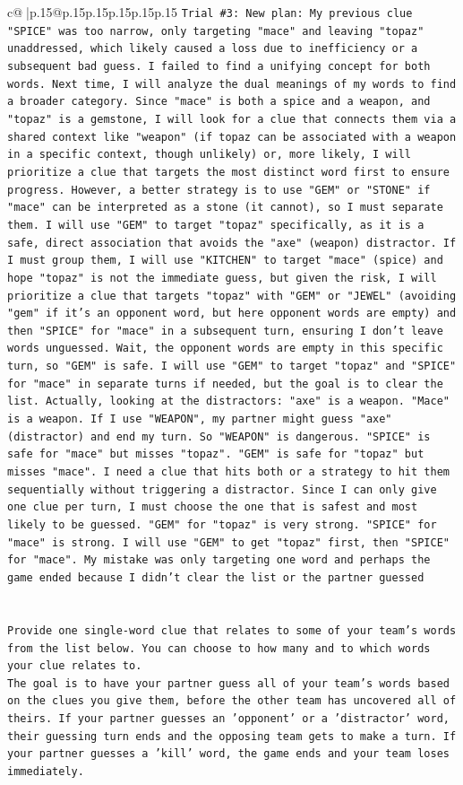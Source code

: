 \documentclass{article}
\begin{document}
{\begin{supertabular}{c@{$\;$}|p{.15\linewidth}@{}p{.15\linewidth}p{.15\linewidth}p{.15\linewidth}p{.15\linewidth}p{.15\linewidth}}
{{{\texttt{Trial \#3: New plan: My previous clue "SPICE" was too narrow, only targeting "mace" and leaving "topaz" unaddressed, which likely caused a loss due to inefficiency or a subsequent bad guess. I failed to find a unifying concept for both words. Next time, I will analyze the dual meanings of my words to find a broader category. Since "mace" is both a spice and a weapon, and "topaz" is a gemstone, I will look for a clue that connects them via a shared context like "weapon" (if topaz can be associated with a weapon in a specific context, though unlikely) or, more likely, I will prioritize a clue that targets the most distinct word first to ensure progress. However, a better strategy is to use "GEM" or "STONE" if "mace" can be interpreted as a stone (it cannot), so I must separate them. I will use "GEM" to target "topaz" specifically, as it is a safe, direct association that avoids the "axe" (weapon) distractor. If I must group them, I will use "KITCHEN" to target "mace" (spice) and hope "topaz" is not the immediate guess, but given the risk, I will prioritize a clue that targets "topaz" with "GEM" or "JEWEL" (avoiding "gem" if it's an opponent word, but here opponent words are empty) and then "SPICE" for "mace" in a subsequent turn, ensuring I don't leave words unguessed. Wait, the opponent words are empty in this specific turn, so "GEM" is safe. I will use "GEM" to target "topaz" and "SPICE" for "mace" in separate turns if needed, but the goal is to clear the list. Actually, looking at the distractors: "axe" is a weapon. "Mace" is a weapon. If I use "WEAPON", my partner might guess "axe" (distractor) and end my turn. So "WEAPON" is dangerous. "SPICE" is safe for "mace" but misses "topaz". "GEM" is safe for "topaz" but misses "mace". I need a clue that hits both or a strategy to hit them sequentially without triggering a distractor. Since I can only give one clue per turn, I must choose the one that is safest and most likely to be guessed. "GEM" for "topaz" is very strong. "SPICE" for "mace" is strong. I will use "GEM" to get "topaz" first, then "SPICE" for "mace". My mistake was only targeting one word and perhaps the game ended because I didn't clear the list or the partner guessed} \\
\\ 
\\ 
\texttt{Provide one single{-}word clue that relates to some of your team's words from the list below. You can choose to how many and to which words your clue relates to.} \\
\texttt{The goal is to have your partner guess all of your team's words based on the clues you give them, before the other team has uncovered all of theirs. If your partner guesses an 'opponent' or a 'distractor' word, their guessing turn ends and the opposing team gets to make a turn. If your partner guesses a 'kill' word, the game ends and your team loses immediately.} \\
}}}
\end{supertabular}}
\end{document}
